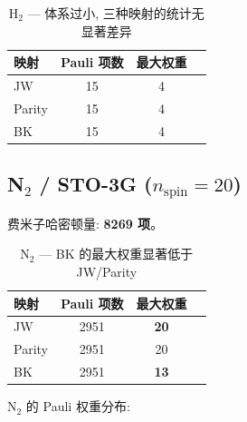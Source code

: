 \documentclass[fontset=mac]{ctexart}
\begin{document}
\begin{table}[H]
\centering
\begin{tabular}{lccc}
\toprule
\textbf{映射} & \textbf{Pauli 项数} & \textbf{最大权重} \\
\midrule
JW     & 15 & 4 \\
Parity & 15 & 4 \\
BK     & 15 & 4 \\
\bottomrule
\end{tabular}
\caption{H$_2$ --- 体系过小, 三种映射的统计无显著差异}
\end{table}

\subsection*{N$_2$ / STO-3G ($n_{\text{spin}}=20$)}

费米子哈密顿量: \textbf{8269 项}。

\begin{table}[H]
\centering
\begin{tabular}{lccc}
\toprule
\textbf{映射} & \textbf{Pauli 项数} & \textbf{最大权重} \\
\midrule
JW     & 2951 & \textbf{20} \\
Parity & 2951 & 20 \\
BK     & 2951 & \textbf{13} \\
\bottomrule
\end{tabular}
\caption{N$_2$ --- BK 的最大权重显著低于 JW/Parity}
\end{table}

N$_2$ 的 Pauli 权重分布:
\end{document}
